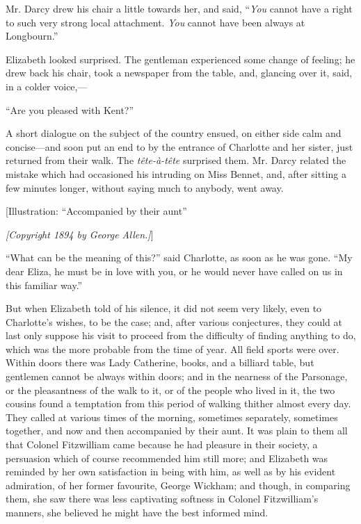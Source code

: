\documentclass[12pt]{book}
\begin{document}
Mr. Darcy drew his chair a little towards her, and said, ``\textit{You} cannot have a right to such very strong local attachment. \textit{You} cannot have been always at Longbourn.''

Elizabeth looked surprised. The gentleman experienced some change of feeling; he drew back his chair, took a newspaper from the table, and, glancing over it, said, in a colder voice,---

``Are you pleased with Kent?''

A short dialogue on the subject of the country ensued, on either side calm and concise---and soon put an end to by the entrance of Charlotte and her sister, just returned from their walk. The \textit{tête-à-tête} surprised them. Mr. Darcy related the mistake which had occasioned his intruding on Miss Bennet, and, after sitting a few minutes longer, without saying much to anybody, went away.

[Illustration: ``Accompanied by their aunt''

\emph{[\textit{Copyright 1894 by George Allen.}]}]

``What can be the meaning of this?'' said Charlotte, as soon as he was gone. ``My dear Eliza, he must be in love with you, or he would never have called on us in this familiar way.''

But when Elizabeth told of his silence, it did not seem very likely, even to Charlotte's wishes, to be the case; and, after various conjectures, they could at last only suppose his visit to proceed from the difficulty of finding anything to do, which was the more probable from the time of year. All field sports were over. Within doors there was Lady Catherine, books, and a billiard table, but gentlemen cannot be always within doors; and in the nearness of the Parsonage, or the pleasantness of the walk to it, or of the people who lived in it, the two cousins found a temptation from this period of walking thither almost every day. They called at various times of the morning, sometimes separately, sometimes together, and now and then accompanied by their aunt. It was plain to them all that Colonel Fitzwilliam came because he had pleasure in their society, a persuasion which of course recommended him still more; and Elizabeth was reminded by her own satisfaction in being with him, as well as by his evident admiration, of her former favourite, George Wickham; and though, in comparing them, she saw there was less captivating softness in Colonel Fitzwilliam's manners, she believed he might have the best informed mind.
\end{document}
